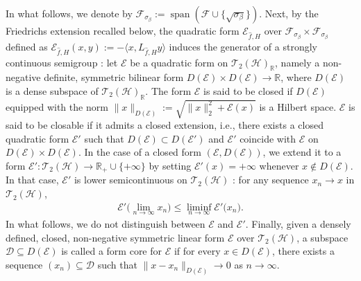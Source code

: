 \documentclass[11pt]{amsart}
\newcommand{\1}{\mathbbm{1}}
\theoremstyle{plain}
\theoremstyle{definition}
\theoremstyle{remark}
\numberwithin{equation}{section}
\begin{document}
\noindent In what follows, we denote by $\mathscr{F}_{\sigma_\beta}:=\operatorname{span}(\mathscr{F}\cup\{\sqrt{\sigma_\beta}\})$. Next, by the Friedrichs extension recalled below, the quadratic form $\mathcal{E}_{\widehat{f},H}$ over $\mathscr{F}_{\sigma_\beta}\times \mathscr{F}_{\sigma_\beta}$ defined as $\mathcal{E}_{\widehat{f},H}(x,y):=-\langle x,L_{\widehat{f},H}y\rangle$ induces the generator of a strongly continuous semigroup
\cite[Lemma 10.16, Theorem 10.7]{Schmdgen2012}: let $\mathcal{E}$ be a quadratic form on $\mathscr{T}_2(\mathcal{H})_{\mathbb{R}}$, namely a non-negative definite, symmetric bilinear form $D(\mathcal{E})\times D(\mathcal{E})\to\mathbb{R}$, where $D(\mathcal{E})$ is a dense subspace of $\mathscr{T}_2(\mathcal{H})_{\mathbb{R}}$. The form $\mathcal{E}$ is said to be closed if $D(\mathcal{E})$ equipped with the norm $\|x\|_{D(\mathcal{E})}:=\sqrt{\|x\|_2^2+\mathcal{E}(x)}$ is a Hilbert space. $\mathcal{E}$ is said to be closable if it admits a closed extension, i.e., there exists a closed quadratic form $\mathcal{E}'$ such that $D(\mathcal{E})\subset D(\mathcal{E}')$ and $\mathcal{E}'$ coincide with $\mathcal{E}$ on $D(\mathcal{E})\times D(\mathcal{E})$.
In the case of a closed form $(\mathcal{E},D(\mathcal{E}))$, we extend it to a form $ \mathcal{E}':\mathscr{T}_2(\mathcal{H})\to \mathbb{R}_+\cup \{+\infty\} $ by setting $\mathcal{E}'(x)=+\infty$ whenever $x\notin D(\mathcal{E})$. In that case, $\mathcal{E}'$ is lower semicontinuous on $\mathscr{T}_2(\mathcal{H})$ \cite[Proposition 10.1]{Schmdgen2012}: for any sequence $x_n\to x$ in $\mathscr{T}_2(\mathcal{H})$,
\begin{align}\label{eq.lsc}
\mathcal{E}'\big(\lim_{n\to\infty} x_n\big)\le \liminf_{n\to\infty}\mathcal{E}'\big(x_n\big).
\end{align}
In what follows, we do not distinguish between $\mathcal{E}$ and $\mathcal{E}'$. Finally, given a densely defined, closed, non-negative symmetric linear form $\mathcal{E}$ over $\mathscr{T}_2(\mathcal{H})$, a subspace $\mathscr{D}\subseteq D(\mathcal{E})$ is called a form core for $\mathcal{E}$ if for every $x\in D(\mathcal{E})$, there exists a sequence $(x_n)\subseteq \mathscr{D}$ such that $\|x-x_n\|_{D(\mathcal{E})}\to 0$ as $n\to\infty$.
\end{document}
